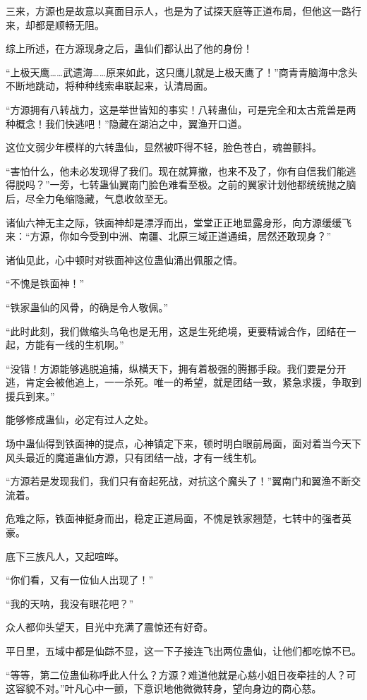 \begin{this_body}
三来，方源也是故意以真面目示人，也是为了试探天庭等正道布局，但他这一路行来，却都是顺畅无阻。

综上所述，在方源现身之后，蛊仙们都认出了他的身份！

“上极天鹰……武遗海……原来如此，这只鹰儿就是上极天鹰了！”商青青脑海中念头不断地跳动，将种种线索串联起来，认清局面。

“方源拥有八转战力，这是举世皆知的事实！八转蛊仙，可是完全和太古荒兽是两种概念！我们快逃吧！”隐藏在湖泊之中，翼渔开口道。

这位文弱少年模样的六转蛊仙，显然被吓得不轻，脸色苍白，魂兽颤抖。

“害怕什么，他未必发现得了我们。现在就算撤，也来不及了，你有自信我们能逃得脱吗？”一旁，七转蛊仙翼南门脸色难看至极。之前的翼家计划他都统统抛之脑后，尽全力龟缩隐藏，气息收敛至无。

诸仙六神无主之际，铁面神却是漂浮而出，堂堂正正地显露身形，向方源缓缓飞来：“方源，你如今受到中洲、南疆、北原三域正道通缉，居然还敢现身？”

诸仙见此，心中顿时对铁面神这位蛊仙涌出佩服之情。

“不愧是铁面神！”

“铁家蛊仙的风骨，的确是令人敬佩。”

“此时此刻，我们做缩头乌龟也是无用，这是生死绝境，更要精诚合作，团结在一起，方能有一线的生机啊。”

“没错！方源能够逃脱追捕，纵横天下，拥有着极强的腾挪手段。我们要是分开逃，肯定会被他追上，一一杀死。唯一的希望，就是团结一致，紧急求援，争取到援兵到来。”

能够修成蛊仙，必定有过人之处。

场中蛊仙得到铁面神的提点，心神镇定下来，顿时明白眼前局面，面对着当今天下风头最近的魔道蛊仙方源，只有团结一战，才有一线生机。

“方源若是发现我们，我们只有奋起死战，对抗这个魔头了！”翼南门和翼渔不断交流着。

危难之际，铁面神挺身而出，稳定正道局面，不愧是铁家翘楚，七转中的强者英豪。

底下三族凡人，又起喧哗。

“你们看，又有一位仙人出现了！”

“我的天呐，我没有眼花吧？”

众人都仰头望天，目光中充满了震惊还有好奇。

平日里，五域中都是仙踪不显，这一下子接连飞出两位蛊仙，让他们都吃惊不已。

“等等，第二位蛊仙称呼此人什么？方源？难道他就是心慈小姐日夜牵挂的人？可这容貌不对。”叶凡心中一颤，下意识地他微微转身，望向身边的商心慈。


\end{this_body}
